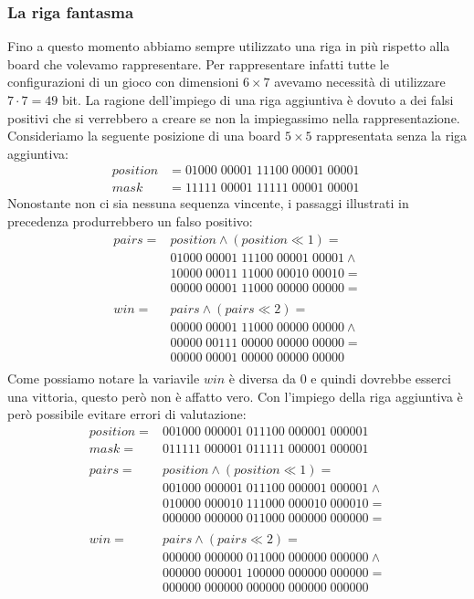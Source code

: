 \documentclass[a4paper]{article}
\begin{document}
\subsubsection{La riga fantasma}
Fino a questo momento abbiamo sempre utilizzato una riga in più rispetto alla
board che volevamo rappresentare. Per rappresentare infatti tutte le 
configurazioni di un gioco con dimensioni $6 \times 7$ avevamo necessità di 
utilizzare $7 \cdot 7 = 49$ bit. La ragione dell'impiego di una riga aggiuntiva
è dovuto a dei falsi positivi che si verrebbero a creare se non la impiegassimo
nella rappresentazione. Consideriamo la seguente posizione di una board 
$5 \times 5$ rappresentata senza la riga aggiuntiva:
\begin{align*}
  position &= 01000\; 00001\; 11100\; 00001\; 00001\\
  mask &= 11111\; 00001\; 11111\; 00001\; 00001\;
\end{align*}
Nonostante non ci sia nessuna sequenza vincente, i passaggi illustrati in 
precedenza produrrebbero un falso positivo:
\begin{align*}
  pairs = &position \land (position \ll 1) =\\
  &01000 \; 00001 \; 11100 \; 00001 \; 00001 \land \\
  &10000 \; 00011 \; 11000 \; 00010 \; 00010 = \\
  &00000 \; 00001 \; 11000 \; 00000 \; 00000 = \\
  \\
  win = &pairs \land (pairs \ll 2) =\\
  &00000 \; 00001 \; 11000 \; 00000 \; 00000 \land \\
  &00000 \; 00111 \; 00000 \; 00000 \; 00000 = \\
  &00000 \; 00001 \; 00000 \; 00000 \; 00000 \\
\end{align*}
Come possiamo notare la variavile $win$ è diversa da 0 e quindi dovrebbe esserci
una vittoria, questo però non è affatto vero. Con l'impiego della riga aggiuntiva
è però possibile evitare errori di valutazione:
\begin{align*}
  position = &001000\; 000001\; 011100\; 000001\; 000001\\
  mask = &011111\; 000001\; 011111\; 000001\; 000001\; \\
  \\
  pairs = &position \land (position \ll 1) =\\
  &001000 \; 000001 \; 011100 \; 000001 \; 000001 \land \\
  &010000 \; 000010 \; 111000 \; 000010 \; 000010 = \\
  &000000 \; 000000 \; 011000 \; 000000 \; 000000 = \\
  \\
  win = &pairs \land (pairs \ll 2) =\\
  &000000 \; 000000 \; 011000 \; 000000 \; 000000 \land \\
  &000000 \; 000001 \; 100000 \; 000000 \; 000000 = \\
  &000000 \; 000000 \; 000000 \; 000000 \; 000000 \\
\end{align*}
\end{document}
